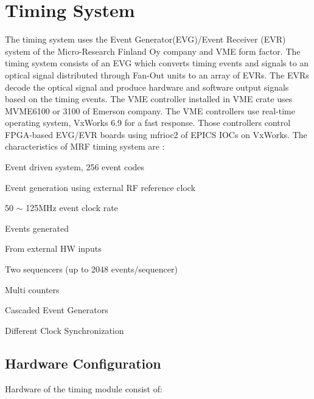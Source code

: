 \documentclass[a4paper,
              ]{jacow}
\begin{document}
\section{Timing System}
The timing system uses the Event Generator(EVG)/Event Receiver (EVR)\cite{mrf} system of the Micro-Research Finland Oy company and VME form factor. The timing system consists of an EVG which converts timing events and signals to an optical signal distributed through Fan-Out units to an array of EVRs. The EVRs decode the optical signal and produce hardware and software output signals based on the timing events. The VME controller installed in VME crate uses MVME6100 or 3100 of Emerson company. The VME controllers use real-time operating system, VxWorks 6.9 for a fast response. Those controllers control FPGA-based EVG/EVR boards using mfrioc2 of EPICS IOCs on VxWorks.
\hfil\break
The characteristics of MRF timing system are :
\begin{Itemize}
	\item Event driven system, 256 event codes
	\item Event generation using external RF reference clock
	\item 50 $\sim$  125MHz event clock rate
	\item Events generated
	\begin{Itemize}
		\item From external HW inputs
		\item Two sequencers (up to 2048 events/sequencer)
		\item Multi counters
	\end{Itemize}
	\item Cascaded Event Generators
	\item Different Clock Synchronization
\end{Itemize}

\subsection{Hardware Configuration}

Hardware of the timing module consist of:
\end{document}
